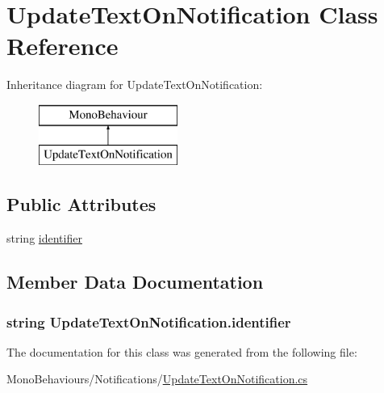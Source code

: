 \hypertarget{class_update_text_on_notification}{}\section{Update\+Text\+On\+Notification Class Reference}
\label{class_update_text_on_notification}
Inheritance diagram for Update\+Text\+On\+Notification\+:\begin{figure}[H]
\begin{center}
\leavevmode
\includegraphics[height=2.000000cm]{class_update_text_on_notification}
\end{center}
\end{figure}
\subsection*{Public Attributes}
\begin{DoxyCompactItemize}
\item 
string \hyperlink{class_update_text_on_notification_a9750875423fe8e7255b56b122dc412fb}{identifier}
\end{DoxyCompactItemize}


\subsection{Member Data Documentation}
\subsubsection[{\texorpdfstring{identifier}{identifier}}]{\setlength{\rightskip}{0pt plus 5cm}string Update\+Text\+On\+Notification.\+identifier}\hypertarget{class_update_text_on_notification_a9750875423fe8e7255b56b122dc412fb}{}\label{class_update_text_on_notification_a9750875423fe8e7255b56b122dc412fb}


The documentation for this class was generated from the following file\+:\begin{DoxyCompactItemize}
\item 
Mono\+Behaviours/\+Notifications/\hyperlink{_update_text_on_notification_8cs}{Update\+Text\+On\+Notification.\+cs}\end{DoxyCompactItemize}
